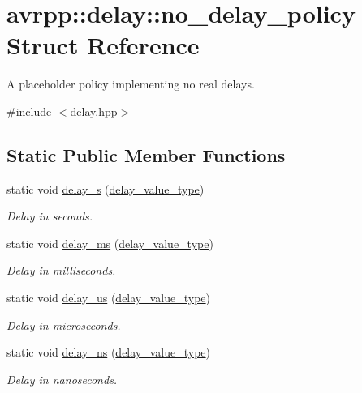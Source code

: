 \hypertarget{structavrpp_1_1delay_1_1no__delay__policy}{
\section{avrpp::delay::no\_\-delay\_\-policy Struct Reference}
\label{structavrpp_1_1delay_1_1no__delay__policy}
}


A placeholder policy implementing no real delays.  




{\ttfamily \#include $<$delay.hpp$>$}

\subsection*{Static Public Member Functions}
\begin{DoxyCompactItemize}
\item 
static void \hyperlink{structavrpp_1_1delay_1_1no__delay__policy_a8ead7f75b39ea5acf4fdae8e19d5c791}{delay\_\-s} (\hyperlink{namespaceavrpp_1_1delay_a64f093ce9e68cc79894a8549286594f0}{delay\_\-value\_\-type})
\begin{DoxyCompactList}\small\item\em Delay in seconds. \item\end{DoxyCompactList}\item 
static void \hyperlink{structavrpp_1_1delay_1_1no__delay__policy_a7a02b28deadb16319bcd4723bec5510a}{delay\_\-ms} (\hyperlink{namespaceavrpp_1_1delay_a64f093ce9e68cc79894a8549286594f0}{delay\_\-value\_\-type})
\begin{DoxyCompactList}\small\item\em Delay in milliseconds. \item\end{DoxyCompactList}\item 
static void \hyperlink{structavrpp_1_1delay_1_1no__delay__policy_a53f7c8f58c56edba3c689b72afdc586f}{delay\_\-us} (\hyperlink{namespaceavrpp_1_1delay_a64f093ce9e68cc79894a8549286594f0}{delay\_\-value\_\-type})
\begin{DoxyCompactList}\small\item\em Delay in microseconds. \item\end{DoxyCompactList}\item 
static void \hyperlink{structavrpp_1_1delay_1_1no__delay__policy_ad34e6f09496feacd169ffca40c71fb54}{delay\_\-ns} (\hyperlink{namespaceavrpp_1_1delay_a64f093ce9e68cc79894a8549286594f0}{delay\_\-value\_\-type})
\begin{DoxyCompactList}\small\item\em Delay in nanoseconds. \item\end{DoxyCompactList}\end{DoxyCompactItemize}



